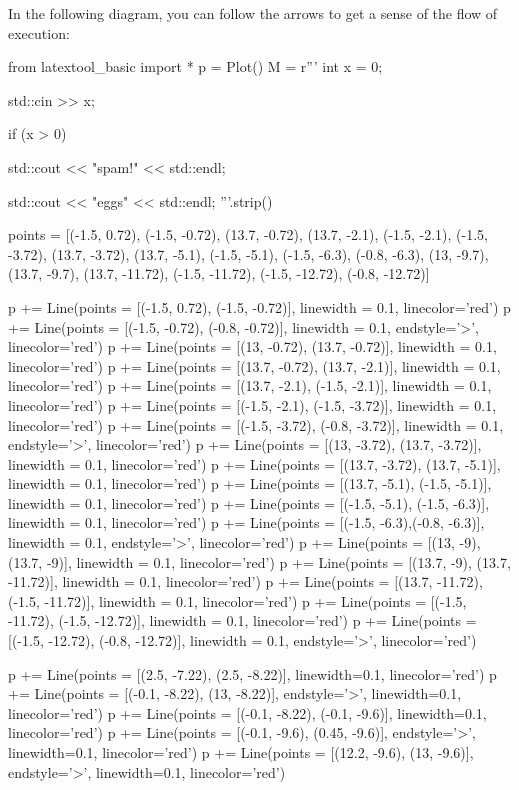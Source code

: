 In the following diagram, you can follow the arrows to get a sense of
the flow of execution:
\begin{python}
from latextool_basic import *
p = Plot()
M = r'''
int x = 0;

std::cin >> x;
                                                                          
if (x > 0)

   std::cout << "spam!" << std::endl;   

std::cout << "eggs" << std::endl;
'''.strip()

points = [(-1.5, 0.72), (-1.5, -0.72), (13.7, -0.72), (13.7, -2.1), (-1.5, -2.1), (-1.5, -3.72), (13.7, -3.72), (13.7, -5.1), (-1.5, -5.1), (-1.5, -6.3), (-0.8, -6.3), (13, -9.7), (13.7, -9.7), (13.7, -11.72), (-1.5, -11.72), (-1.5, -12.72), (-0.8, -12.72)]

p += Line(points = [(-1.5, 0.72), (-1.5, -0.72)], linewidth = 0.1, linecolor='red')
p += Line(points = [(-1.5, -0.72), (-0.8, -0.72)], linewidth = 0.1, endstyle='>', linecolor='red')
p += Line(points = [(13, -0.72), (13.7, -0.72)], linewidth = 0.1, linecolor='red')
p += Line(points = [(13.7, -0.72), (13.7, -2.1)], linewidth = 0.1, linecolor='red')
p += Line(points = [(13.7, -2.1), (-1.5, -2.1)], linewidth = 0.1, linecolor='red')
p += Line(points = [(-1.5, -2.1), (-1.5, -3.72)], linewidth = 0.1, linecolor='red')
p += Line(points = [(-1.5, -3.72), (-0.8, -3.72)], linewidth = 0.1, endstyle='>', linecolor='red')
p += Line(points = [(13, -3.72), (13.7, -3.72)], linewidth = 0.1, linecolor='red')
p += Line(points = [(13.7, -3.72), (13.7, -5.1)], linewidth = 0.1, linecolor='red')
p += Line(points = [(13.7, -5.1), (-1.5, -5.1)], linewidth = 0.1, linecolor='red')
p += Line(points = [(-1.5, -5.1), (-1.5, -6.3)], linewidth = 0.1, linecolor='red')
p += Line(points = [(-1.5, -6.3),(-0.8, -6.3)], linewidth = 0.1, endstyle='>', linecolor='red')
p += Line(points = [(13, -9), (13.7, -9)], linewidth = 0.1, linecolor='red')
p += Line(points = [(13.7, -9), (13.7, -11.72)], linewidth = 0.1, linecolor='red')
p += Line(points = [(13.7, -11.72), (-1.5, -11.72)], linewidth = 0.1, linecolor='red')
p += Line(points = [(-1.5, -11.72), (-1.5, -12.72)], linewidth = 0.1, linecolor='red')
p += Line(points = [(-1.5, -12.72), (-0.8, -12.72)], linewidth = 0.1, endstyle='>', linecolor='red')

p += Line(points = [(2.5, -7.22), (2.5, -8.22)], linewidth=0.1, linecolor='red')
p += Line(points = [(-0.1, -8.22), (13, -8.22)], endstyle='>', linewidth=0.1, linecolor='red')
p += Line(points = [(-0.1, -8.22), (-0.1, -9.6)], linewidth=0.1, linecolor='red')
p += Line(points = [(-0.1, -9.6), (0.45, -9.6)], endstyle='>', linewidth=0.1, linecolor='red')
p += Line(points = [(12.2, -9.6), (13, -9.6)], endstyle='>', linewidth=0.1, linecolor='red')


\end{python}
